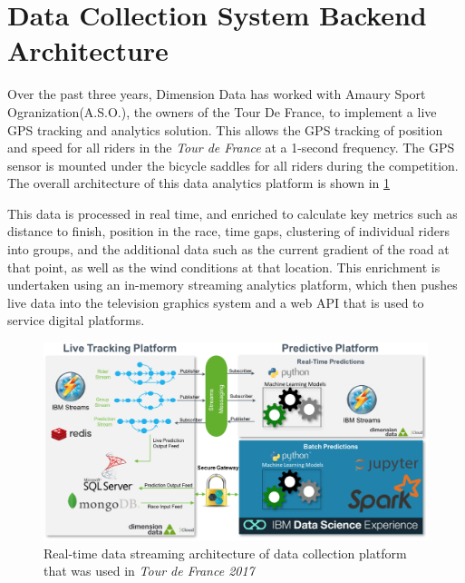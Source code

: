 \documentclass[runningheads]{llncs}
\begin{document}
\clearpage
\appendix
\section{Data Collection System Backend Architecture}
Over the past three years, Dimension Data has worked with Amaury Sport
Ogranization(A.S.O.), the owners of the Tour De France, to implement a
live GPS tracking and analytics solution. This allows the GPS tracking
of position and speed for all riders in the {\it{Tour de France}} at a 1-second
frequency. The GPS sensor is mounted under the bicycle saddles for all
riders during the competition.  The overall architecture of this data
analytics platform is shown in \ref{fig:data_collection_platform}

This data is processed in real time, and enriched to calculate key
metrics such as distance to finish, position in the race, time gaps,
clustering of individual riders into groups, and the additional data
such as the current gradient of the road at that point, as well as the
wind conditions at that location. This enrichment is undertaken using an
in-memory streaming analytics platform, which then pushes live data into
the television graphics system and a web API that is used to service
digital platforms.

\begin{figure}[h]
 \includegraphics[width=\textwidth]{fig/TDF_system_architecture.eps}
 \caption{Real-time data streaming architecture of data collection
 platform that was used in {\it{Tour de France 2017}}}
 \label{fig:data_collection_platform}
\end{figure}
\end{document}
